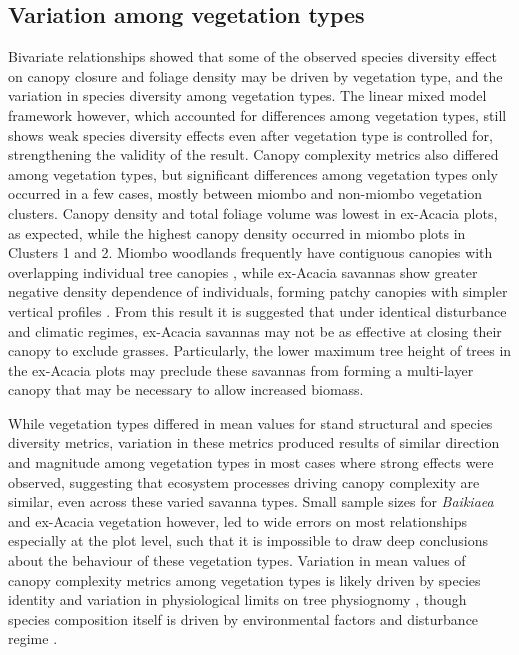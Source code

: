 \documentclass[11pt,a4paper]{article}
\begin{document}
\subsection{Variation among vegetation types}

Bivariate relationships showed that some of the observed species diversity effect on canopy closure and foliage density may be driven by vegetation type, and the variation in species diversity among vegetation types. The linear mixed model framework however, which accounted for differences among vegetation types, still shows weak species diversity effects even after vegetation type is controlled for, strengthening the validity of the result. Canopy complexity metrics also differed among vegetation types, but significant differences among vegetation types only occurred in a few cases, mostly between miombo and non-miombo vegetation clusters. Canopy density and total foliage volume was lowest in ex-Acacia plots, as expected, while the highest canopy density occurred in miombo plots in Clusters 1 and 2. Miombo woodlands frequently have contiguous canopies with overlapping individual tree canopies \citep{Solbrig1996}, while ex-Acacia savannas show greater negative density dependence of individuals, forming patchy canopies with simpler vertical profiles \citep{Pillay2012}. From this result it is suggested that under identical disturbance and climatic regimes, ex-Acacia savannas may not be as effective at closing their canopy to exclude grasses. Particularly, the lower maximum tree height of trees in the ex-Acacia plots may preclude these savannas from forming a multi-layer canopy that may be necessary to allow increased biomass.

While vegetation types differed in mean values for stand structural and species diversity metrics, variation in these metrics produced results of similar direction and magnitude among vegetation types in most cases where strong effects were observed, suggesting that ecosystem processes driving canopy complexity are similar, even across these varied savanna types. Small sample sizes for \textit{Baikiaea} and ex-Acacia vegetation however, led to wide errors on most relationships especially at the plot level, such that it is impossible to draw deep conclusions about the behaviour of these vegetation types. Variation in mean values of canopy complexity metrics among vegetation types is likely driven by species identity and variation in physiological limits on tree physiognomy \citep{Seidel2013, Sercu2017}, though species composition itself is driven by environmental factors and disturbance regime \citep{Ribeiro2020}. 
\end{document}
